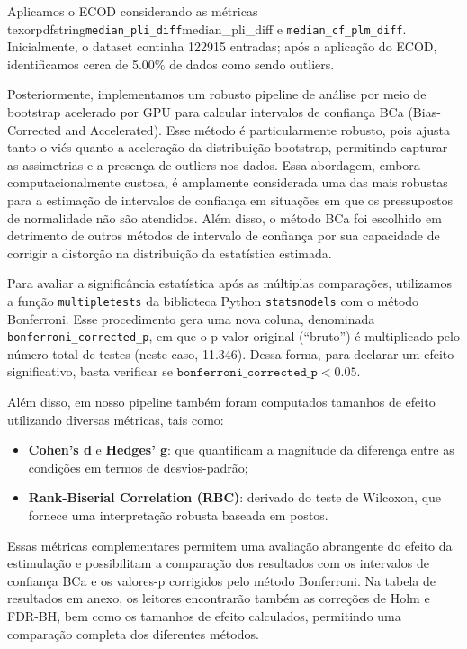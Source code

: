 Aplicamos o ECOD considerando as métricas texorpdfstring{\texttt{median\_pli\_diff}}{median_pli_diff} e \texorpdfstring{\texttt{median\_cf\_plm\_diff}}{median_cf_plm_diff}. Inicialmente, o dataset continha 122915 entradas; após a aplicação do ECOD, identificamos cerca de 5.00\% de dados como sendo outliers.

Posteriormente, implementamos um robusto pipeline de análise por meio de bootstrap acelerado por GPU para calcular intervalos de confiança BCa (Bias-Corrected and Accelerated). Esse método é particularmente robusto, pois ajusta tanto o viés quanto a aceleração da distribuição bootstrap, permitindo capturar as assimetrias e a presença de outliers nos dados. Essa abordagem, embora computacionalmente custosa, é amplamente considerada uma das mais robustas para a estimação de intervalos de confiança em situações em que os pressupostos de normalidade não são atendidos. Além disso, o método BCa foi escolhido em detrimento de outros métodos de intervalo de confiança por sua capacidade de corrigir a distorção na distribuição da estatística estimada.

Para avaliar a significância estatística após as múltiplas comparações, utilizamos a 
função \texttt{multipletests} da biblioteca Python \texttt{statsmodels} com o método Bonferroni. 
Esse procedimento gera uma nova coluna, denominada 
\texttt{bonferroni\_corrected\_p}, em que o p-valor original (``bruto'') é multiplicado 
pelo número total de testes (neste caso, 11.346). Dessa forma, para declarar um efeito 
significativo, basta verificar se 
\(\texttt{bonferroni\_corrected\_p} < 0.05\).

Além disso, em nosso pipeline também foram computados tamanhos de efeito utilizando diversas métricas, tais como:
\begin{itemize}
    \item \textbf{Cohen's d} e \textbf{Hedges' g}: que quantificam a magnitude da diferença entre as condições em termos de desvios-padrão;
    \item \textbf{Rank-Biserial Correlation (RBC)}: derivado do teste de Wilcoxon, que fornece uma interpretação robusta baseada em postos.
\end{itemize}
Essas métricas complementares permitem uma avaliação abrangente do efeito da estimulação e possibilitam a comparação dos resultados com os intervalos de confiança BCa e os valores-p corrigidos pelo método Bonferroni. Na tabela de resultados em anexo, os leitores encontrarão também as correções de Holm e FDR-BH, bem como os tamanhos de efeito calculados, permitindo uma comparação completa dos diferentes métodos.

